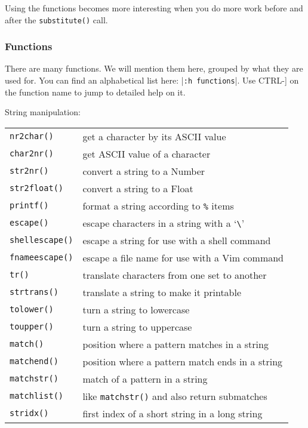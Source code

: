 Using the functions becomes more interesting when you do more work before and after the \texttt{substitute()} call.

\subsubsection{Functions}
\label{function-list}
There are many functions.
We will mention them here, grouped by what they are used for.
You can find an alphabetical list here: |\texttt{:h functions}|.
Use CTRL-] on the function name to jump to detailed help on it.

String manipulation:
\label{string-functions}
\begin{center} \begin{tabular}{l l}
				\texttt{nr2char()} & get a character by its ASCII value \\
				\texttt{char2nr()} & get ASCII value of a character \\
				\texttt{str2nr()} & convert a string to a Number \\
				\texttt{str2float()} & convert a string to a Float \\
				\texttt{printf()} & format a string according to \texttt{\%} items \\
				\texttt{escape()} & escape characters in a string with a `\texttt{\textbackslash{}}' \\
				\texttt{shellescape()} & escape a string for use with a shell command \\
				\texttt{fnameescape()} & escape a file name for use with a Vim command \\
				\texttt{tr()} & translate characters from one set to another \\
				\texttt{strtrans()} & translate a string to make it printable \\
				\texttt{tolower()} & turn a string to lowercase \\
				\texttt{toupper()} & turn a string to uppercase \\
				\texttt{match()} & position where a pattern matches in a string \\
				\texttt{matchend()} & position where a pattern match ends in a string \\
				\texttt{matchstr()} & match of a pattern in a string \\
				\texttt{matchlist()} & like \texttt{matchstr()} and also return submatches \\
				\texttt{stridx()} & first index of a short string in a long string \\

\end{tabular}
\end{center}
